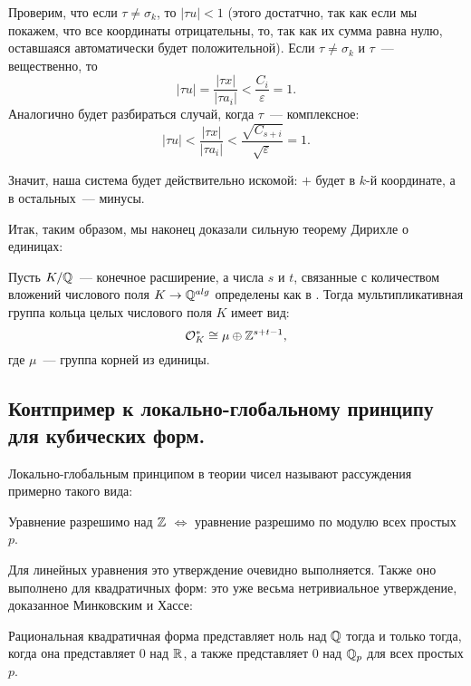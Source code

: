 	  Проверим, что если $\tau  \neq \sigma_k$, то $|\tau u| < 1$ (этого достатчно, так как если мы покажем, что все координаты отрицательны, то, так как их сумма равна нулю, оставшаяся автоматически будет положительной). Если  $\tau \neq \sigma_k$ и $\tau$~--- вещественно, то 
	  \[
	  	|\tau u| = \frac{|\tau x|}{|\tau a_i|} < \frac{C_i}{\varepsilon} = 1.
	  \]
	  Аналогично будет разбираться случай, когда $\tau$~--- комплексное: 
	  \[
	  	|\tau u| < \frac{|\tau x|}{|\tau a_i|} < \frac{\sqrt{C_{s + i}}}{\sqrt{\varepsilon}} = 1.
	  \]

	  Значит, наша система будет действительно искомой: $+$ будет в $k$-й координате, а в остальных~--- минусы. 

	  Итак, таким образом, мы наконец доказали сильную теорему Дирихле о единицах: 

	  \begin{theorem}
	  Пусть $K/\mathbb{Q}$~--- конечное расширение, а числа $s$ и $t$, связанные с количеством вложений числового поля $K \to \mathbb{Q}^{alg}$ определены как в \hyperlink{real_and_complex_inclusions}{}. Тогда мультипликативная группа кольца целых числового поля $K$ имеет вид: 
	  	\[ \mathcal{O}_{K}^{*} \cong \mu \oplus \mathbb{Z}^{s + t - 1}, \]
	  	где $\mu$~--- группа корней из единицы.
	  \end{theorem}

	  \subsection{Контпример к локально-глобальному принципу для кубических форм.}

	  Локально-глобальным принципом в теории чисел называют рассуждения примерно такого вида: 

	  \begin{center}
	  	Уравнение разрешимо над $\mathbb{Z}$ $\Leftrightarrow$ уравнение разрешимо по модулю всех простых $p$. 
	  \end{center}

	  Для линейных уравнения это утверждение очевидно выполняется. Также оно выполнено для квадратичных форм: это уже весьма нетривиальное утверждение, доказанное Минковским и Хассе: 

	  \begin{theorem}
	  		Рациональная квадратичная форма представляет ноль над $\mathbb{Q}$ тогда и только тогда, когда она представляет 0 над $\mathbb{R}$, а также представляет 0 над $\mathbb{Q}_{p}$ для всех простых $p$.
	  	\end{theorem}

